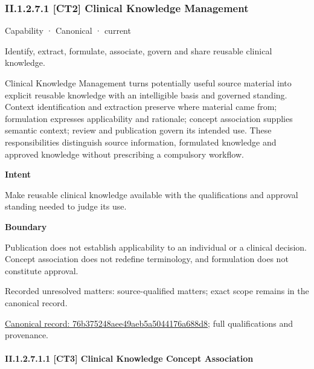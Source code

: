 \subsubsection*{II.1.2.7.1 [CT2] Clinical Knowledge Management}
\label{navigation:II.1.2.7.1}

\label{element:76b375248aee49aeb5a5044176a688d8}
{\small Capability · Canonical · current}\par

Identify, extract, formulate, associate, govern and share reusable clinical knowledge.



Clinical Knowledge Management turns potentially useful source material into explicit reusable knowledge with an intelligible basis and governed standing. Context identification and extraction preserve where material came from; formulation expresses applicability and rationale; concept association supplies semantic context; review and publication govern its intended use. These responsibilities distinguish source information, formulated knowledge and approved knowledge without prescribing a compulsory workflow.



\textbf{Intent}



Make reusable clinical knowledge available with the qualifications and approval standing needed to judge its use.



\textbf{Boundary}



Publication does not establish applicability to an individual or a clinical decision. Concept association does not redefine terminology, and formulation does not constitute approval.


{\small Recorded unresolved matters: source-qualified matters; exact scope remains in the canonical record.}\par
{\footnotesize \href{../../../../continuum/strategy/capability/76b375248aee49aeb5a5044176a688d8.md}{Canonical record: 76b375248aee49aeb5a5044176a688d8}; full qualifications and provenance.}\par
\paragraph*{II.1.2.7.1.1 [CT3] Clinical Knowledge Concept Association}
\label{navigation:II.1.2.7.1.1}

